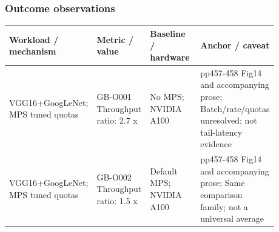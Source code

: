 \documentclass[12pt,a4paper]{article}
\begin{document}
\subsubsection*{Outcome observations}
\begin{longtable}{p{0.24\linewidth}p{0.19\linewidth}p{0.2\linewidth}p{0.25\linewidth}}
\toprule
Workload /\allowbreak{} mechanism & Metric /\allowbreak{} value & Baseline /\allowbreak{} hardware & Anchor /\allowbreak{} caveat\\\midrule
\endhead
VGG16+GoogLeNet; MPS tuned quotas & GB-O001 Throughput ratio: 2.7 x & No MPS; NVIDIA A100 & pp457-458 Fig14 and accompanying prose; Batch/\allowbreak{}rate/\allowbreak{}quotas unresolved; not tail-latency evidence\\
VGG16+GoogLeNet; MPS tuned quotas & GB-O002 Throughput ratio: 1.5 x & Default MPS; NVIDIA A100 & pp457-458 Fig14 and accompanying prose; Same comparison family; not a universal average\\
\bottomrule
\end{longtable}
\end{document}
